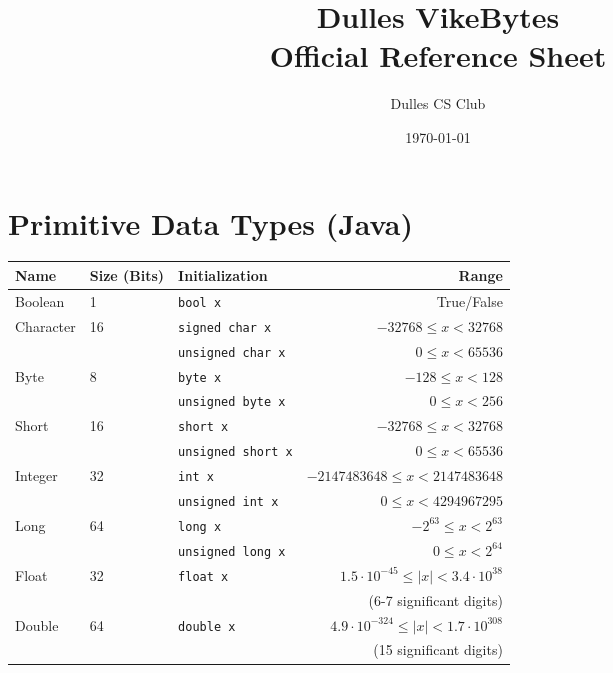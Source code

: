 \documentclass{article}
\title{Dulles VikeBytes\\Official Reference Sheet}
\date{\today}
\author{Dulles CS Club}
\begin{document}

{\let\newpage\relax\maketitle} %

\renewcommand{\arraystretch}{1.25} %
\section{Primitive Data Types (Java)}
\begin{center}\begin{tabular}{lllr}\toprule
  Name      &Size (Bits) &Initialization              &Range \\\midrule
  Boolean   &1           &\lstinline|bool x|          &True/False \\\midrule
  Character &16          &\lstinline|signed char x|   &\(-32768 \leq x < 32768\) \\ 
            &            &\lstinline|unsigned char x| &\(0 \leq x < 65536\) \\
  Byte      &8           &\lstinline|byte x|          &\(-128 \leq x < 128\) \\
            &            &\lstinline|unsigned byte x| &\(0 \leq x < 256\) \\
  Short     &16          &\lstinline|short x|         &\(-32768 \leq x < 32768\) \\
            &            &\lstinline|unsigned short x|&\(0 \leq x < 65536\) \\
  Integer   &32          &\lstinline|int x|           &\(-2147483648 \leq x < 2147483648\) \\
            &            &\lstinline|unsigned int x|  &\(0 \leq x < 4294967295\) \\
  Long      &64          &\lstinline|long x|          &\(-2^{63} \leq x < 2^{63}\) \\
            &            &\lstinline|unsigned long x| &\(0 \leq x < 2^{64}\) \\\midrule
  Float     &32          &\lstinline|float x|         &\(1.5\cdot10^{-45} \leq |x| < 3.4\cdot10^{38}\) \\
            &            &                            &(6-7 significant digits) \\
  Double    &64          &\lstinline|double x|        &\(4.9\cdot10^{-324} \leq |x| < 1.7\cdot10^{308}\) \\
            &            &                            &(15 significant digits) \\
\bottomrule\end{tabular}\end{center}
\end{document}
